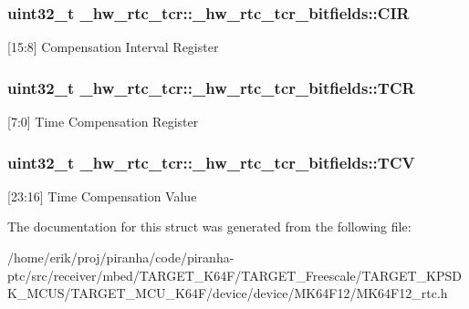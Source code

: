 \subsubsection[{\texorpdfstring{C\+IR}{CIR}}]{\setlength{\rightskip}{0pt plus 5cm}uint32\+\_\+t \+\_\+hw\+\_\+rtc\+\_\+tcr\+::\+\_\+hw\+\_\+rtc\+\_\+tcr\+\_\+bitfields\+::\+C\+IR}\hypertarget{struct__hw__rtc__tcr_1_1__hw__rtc__tcr__bitfields_a14af1426f7d4c5fb26ea7201e811b57d}{}\label{struct__hw__rtc__tcr_1_1__hw__rtc__tcr__bitfields_a14af1426f7d4c5fb26ea7201e811b57d}
\mbox{[}15\+:8\mbox{]} Compensation Interval Register 
\subsubsection[{\texorpdfstring{T\+CR}{TCR}}]{\setlength{\rightskip}{0pt plus 5cm}uint32\+\_\+t \+\_\+hw\+\_\+rtc\+\_\+tcr\+::\+\_\+hw\+\_\+rtc\+\_\+tcr\+\_\+bitfields\+::\+T\+CR}\hypertarget{struct__hw__rtc__tcr_1_1__hw__rtc__tcr__bitfields_ad0344be79119ecb6a52df9baca964052}{}\label{struct__hw__rtc__tcr_1_1__hw__rtc__tcr__bitfields_ad0344be79119ecb6a52df9baca964052}
\mbox{[}7\+:0\mbox{]} Time Compensation Register 
\subsubsection[{\texorpdfstring{T\+CV}{TCV}}]{\setlength{\rightskip}{0pt plus 5cm}uint32\+\_\+t \+\_\+hw\+\_\+rtc\+\_\+tcr\+::\+\_\+hw\+\_\+rtc\+\_\+tcr\+\_\+bitfields\+::\+T\+CV}\hypertarget{struct__hw__rtc__tcr_1_1__hw__rtc__tcr__bitfields_a40b2f2c43fc1c3245ae1b55385d755b9}{}\label{struct__hw__rtc__tcr_1_1__hw__rtc__tcr__bitfields_a40b2f2c43fc1c3245ae1b55385d755b9}
\mbox{[}23\+:16\mbox{]} Time Compensation Value 

The documentation for this struct was generated from the following file\+:\begin{DoxyCompactItemize}
\item 
/home/erik/proj/piranha/code/piranha-\/ptc/src/receiver/mbed/\+T\+A\+R\+G\+E\+T\+\_\+\+K64\+F/\+T\+A\+R\+G\+E\+T\+\_\+\+Freescale/\+T\+A\+R\+G\+E\+T\+\_\+\+K\+P\+S\+D\+K\+\_\+\+M\+C\+U\+S/\+T\+A\+R\+G\+E\+T\+\_\+\+M\+C\+U\+\_\+\+K64\+F/device/device/\+M\+K64\+F12/M\+K64\+F12\+\_\+rtc.\+h\end{DoxyCompactItemize}
